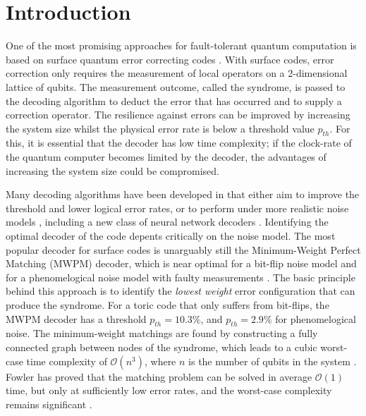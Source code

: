 \section{Introduction}\label{sec:introduction}
One of the most promising approaches for fault-tolerant quantum computation is based on surface quantum error correcting codes \cite{dennis2002topological, kitaev2003fault}. With surface codes, error correction only requires the measurement of local operators on a 2-dimensional lattice of qubits. The measurement outcome, called the syndrome, is passed to the decoding algorithm to deduct the error that has occurred and to supply a correction operator. The resilience against errors can be improved by increasing the system size whilst the physical error rate is below a threshold value $p_{th}$. For this, it is essential that the decoder has low time complexity; if the clock-rate of the quantum computer becomes limited by the decoder, the advantages of increasing the system size could be compromised.

Many decoding algorithms have been developed in that either aim to improve the threshold and lower logical error rates, or to perform under more realistic noise models \cites{wang2003confinement, raussendorf2007faulttolerant, fowler2013minimum, tuckett2020fault, bravyi2014efficient, heim2016optimal, anwar2014fast, bombin2012universal, bravyi2013quantum, darmawan2018linear, duclos2010fast, duclos2013fault, herold2015cellular, horsman2012surface, hutter2015improved, kubica2019cellular, nickerson2019analysing, watson2015fast, wootton2012high, huang2020fault}, including a new class of neural network decoders \cites{baireuther2019neural, chamberland2018deep, liu2019neural, nautrup2019optimizing, torlai2017neural, varsamopoulos2017decoding, varsamopoulos2020decoding}. Identifying the optimal decoder of the code depents critically on the noise model. The most popular decoder for surface codes is unarguably still the Minimum-Weight Perfect Matching (MWPM) decoder, which is near optimal for a bit-flip noise model \cite{dennis2002topological} and for a phenomelogical noise model with faulty measurements \cite{wang2003confinement}. The basic principle behind this approach is to identify the \emph{lowest weight} error configuration that can produce the syndrome. For a toric code that only suffers from bit-flips, the MWPM decoder has a threshold $p_{th} = 10.3\%$, and $p_{th} = 2.9\%$ for phenomelogical noise. The minimum-weight matchings are found by constructing a fully connected graph between nodes of the syndrome, which leads to a cubic worst-case time complexity of $\mathcal{O}(n^3)$, where $n$ is the number of qubits in the system \cite{kolmogorov2009blossom}. Fowler has proved that the matching problem can be solved in average $\mathcal{O}(1)$ time, but only at sufficiently low error rates, and the worst-case complexity remains significant \cite{fowler2013minimum}. 

